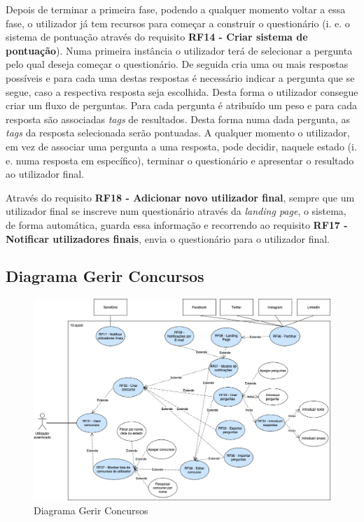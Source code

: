 Depois de terminar a primeira fase, podendo a qualquer momento voltar a essa fase, o utilizador já tem recursos para começar a construir o questionário (i. e. o sistema de pontuação através do requisito \textbf{RF14 - Criar sistema de pontuação}). Numa primeira instância o utilizador terá de selecionar a pergunta pelo qual deseja começar o questionário.
De seguida cria uma ou mais respostas possíveis e para cada uma destas respostas é necessário indicar a pergunta que se segue, caso a respectiva resposta seja escolhida. Desta forma o utilizador consegue criar um fluxo de perguntas.
 Para cada pergunta é atribuído um peso e para cada resposta são associadas \textit{tags} de resultados. Desta forma numa dada pergunta, as \textit{tags} da resposta selecionada serão pontuadas. A qualquer momento o utilizador, em vez de associar uma pergunta a uma resposta, pode decidir, naquele estado (i. e. numa resposta em específico), terminar o questionário e apresentar o resultado ao utilizador final.

Através do requisito \textbf{RF18 - Adicionar novo utilizador final}, sempre que um utilizador final se inscreve num questionário através da \textit{landing page}, o sistema, de forma automática, guarda essa informação e recorrendo ao requisito \textbf{RF17 - Notificar utilizadores finais}, envia o questionário para o utilizador final.


\subsection{Diagrama Gerir Concursos}
\label{d:concursos}
\begin{figure}[ht!]
	\begin{center}
		\includegraphics[width=1\textwidth]{img/rf/gerir-concurso}
		\caption{Diagrama Gerir Concursos}
		\label{fig:rf-gerir-concursos}
	\end{center}
\end{figure}


